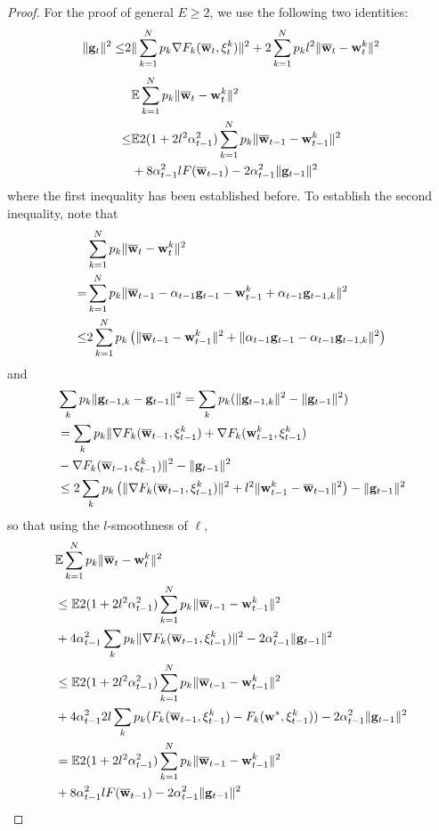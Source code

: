 \begin{proof}
	For the proof of general $E\ge2$, we use the following two identities:
	\begin{align*}
	\|{\mathbf{g}}_{t}\|^{2} \leq&2\|\sum_{k=1}^{N}p_{k}\nabla F_{k}({\overline{\mathbf{w}}}_{t},\xi_{t}^{k})\|^{2}+2\sum_{k=1}^{N}p_{k}l^{2}\|{\overline{\mathbf{w}}}_{t}-{\mathbf{w}}_{t}^{k}\|^{2}\\
	\end{align*}
	\begin{align*}
	&\mathbb{E}\sum_{k=1}^{N}p_{k}\|{\overline{\mathbf{w}}}_{t}-{\mathbf{w}}_{t}^{k}\|^{2}  \\
	\leq&\mathbb{E}2(1+2l^{2}\alpha_{t-1}^{2})\sum_{k=1}^{N}p_{k}\|{\overline{\mathbf{w}}}_{t-1}-{\mathbf{w}}_{t-1}^{k}\|^{2}\\
	&+8\alpha_{t-1}^{2}lF({\overline{\mathbf{w}}}_{t-1})-2\alpha_{t-1}^{2}\|{\mathbf{g}}_{t-1}\|^{2}
	\end{align*}
	where the first inequality has been established before. To establish
	the second inequality, note that 
	\begin{align*}
	&\sum_{k=1}^{N}p_{k}\|{\overline{\mathbf{w}}}_{t}-{\mathbf{w}}_{t}^{k}\|^{2} \\
	=&\sum_{k=1}^{N}p_{k}\|{\overline{\mathbf{w}}}_{t-1}-\alpha_{t-1}{\mathbf{g}}_{t-1}-{\mathbf{w}}_{t-1}^{k}+\alpha_{t-1}{\mathbf{g}}_{t-1,k}\|^{2}\\
	\leq&2\sum_{k=1}^{N}p_{k}\left(\|{\overline{\mathbf{w}}}_{t-1}-{\mathbf{w}}_{t-1}^{k}\|^{2}+\|\alpha_{t-1}{\mathbf{g}}_{t-1}-\alpha_{t-1}{\mathbf{g}}_{t-1,k}\|^{2}\right)
	\end{align*}
	and
	\begin{align*}
	& \sum_{k}p_{k}\|{\mathbf{g}}_{t-1,k}-{\mathbf{g}}_{t-1}\|^{2}=\sum_{k}p_{k}(\|{\mathbf{g}}_{t-1,k}\|^{2}-\|{\mathbf{g}}_{t-1}\|^{2})\\
	& =\sum_{k}p_{k}\|\nabla F_{k}({\overline{\mathbf{w}}}_{t-1},\xi_{t-1}^{k})+\nabla F_{k}({\mathbf{w}}_{t-1}^{k},\xi_{t-1}^{k})\\
	& -\nabla F_{k}({\overline{\mathbf{w}}}_{t-1},\xi_{t-1}^{k})\|^{2}-\|{\mathbf{g}}_{t-1}\|^{2}\\
	& \leq2\sum_{k}p_{k}\left(\|\nabla F_{k}({\overline{\mathbf{w}}}_{t-1},\xi_{t-1}^{k})\|^{2}+l^{2}\|{\mathbf{w}}_{t-1}^{k}-{\overline{\mathbf{w}}}_{t-1}\|^{2}\right)-\|{\mathbf{g}}_{t-1}\|^{2}
	\end{align*}
	so that using the $l$-smoothness of $\ell$, 
	\begin{align*}
	& \mathbb{E}\sum_{k=1}^{N}p_{k}\|{\overline{\mathbf{w}}}_{t}-{\mathbf{w}}_{t}^{k}\|^{2}\\
	& \leq\mathbb{E}2(1+2l^{2}\alpha_{t-1}^{2})\sum_{k=1}^{N}p_{k}\|{\overline{\mathbf{w}}}_{t-1}-{\mathbf{w}}_{t-1}^{k}\|^{2}\\ 
	&+4\alpha_{t-1}^{2}\sum_{k}p_{k}\|\nabla F_{k}({\overline{\mathbf{w}}}_{t-1},\xi_{t-1}^{k})\|^{2}-2\alpha_{t-1}^{2}\|{\mathbf{g}}_{t-1}\|^{2}\\
	& \leq\mathbb{E}2(1+2l^{2}\alpha_{t-1}^{2})\sum_{k=1}^{N}p_{k}\|{\overline{\mathbf{w}}}_{t-1}-{\mathbf{w}}_{t-1}^{k}\|^{2}\\
	& +4\alpha_{t-1}^{2}2l\sum_{k}p_{k}(F_{k}({\overline{\mathbf{w}}}_{t-1},\xi_{t-1}^{k})-F_{k}({\mathbf{w}}^{\ast},\xi_{t-1}^{k}))-2\alpha_{t-1}^{2}\|{\mathbf{g}}_{t-1}\|^{2}\\
	& =\mathbb{E}2(1+2l^{2}\alpha_{t-1}^{2})\sum_{k=1}^{N}p_{k}\|{\overline{\mathbf{w}}}_{t-1}-{\mathbf{w}}_{t-1}^{k}\|^{2}\\
	&+8\alpha_{t-1}^{2}lF({\overline{\mathbf{w}}}_{t-1})-2\alpha_{t-1}^{2}\|{\mathbf{g}}_{t-1}\|^{2}
	\end{align*}
	

\end{proof}
